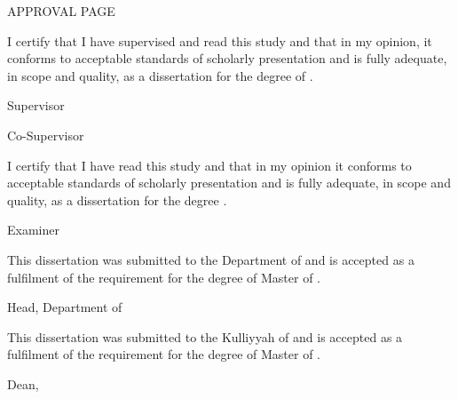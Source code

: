 \documentclass[12pt, a4paper]{memoir}
\begin{document}
\thispagestyle{empty}

\begin{Large}
\begin{center}
\MakeUppercase{Approval Page}
\end{center}
\end{Large}
\vspace{24pt}
I certify that I have supervised and read this study and that in my opinion, it 
conforms to acceptable standards of scholarly presentation and is fully 
adequate, in scope and quality, as a dissertation for the degree of \myDegree.
\\[24pt]

\hfill \makebox[2in]{\dotfill}

\hfill \mySupervisor

\hfill Supervisor
\\[24pt]


\ifdefined\myCoSupervisor
  \hfill \makebox[2in]{\dotfill}

  \hfill \myCoSupervisor

  \hfill Co-Supervisor\\[24pt]
\fi

\ifdefined\myExaminer
  \noindent I certify that I have read this study and that in my opinion it 
  conforms to acceptable standards of scholarly presentation and is fully 
  adequate, in scope and quality, as a dissertation for the degree 
  \myDegree.\\[24pt]

  \hfill \makebox[2in]{\dotfill}

  \hfill \myExaminer

  \hfill Examiner\\[24pt]
\fi

\ifdefined\myDepartmentHead
  \noindent This dissertation was submitted to the Department of \myDepartment and is accepted as a fulfilment of the requirement for the degree of Master of \mySubject.\\[24pt]

  \hfill \makebox[2in]{\dotfill}

  \hfill \myDepartmentHead

  \hfill Head, Department of \myDepartment\\[24pt]
\fi

\ifdefined\myCoSupervisor
  \ifdefined\myExaminer
    \newpage
  \fi
\fi

\noindent This dissertation was submitted to the Kulliyyah of \myKulliyah and 
is accepted as a fulfilment of the requirement for the degree of Master of 
\mySubject.\\[24pt]

\hfill \makebox[2in]{\dotfill}

\hfill \myKulliyahDean

\hfill Dean, \myKulliyah\\[24pt]
\end{document}
